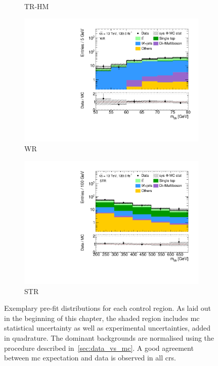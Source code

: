 \begin{figure}
\begin{subfigure}[b]{0.5\linewidth}
		\caption{TR-HM\label{fig:prefit_TRHM}}
	\end{subfigure}\hfill
	\begin{subfigure}[b]{0.5\linewidth}
		\centering\includegraphics[width=1.0\textwidth]{1Lbb_WR_mbb}
		\caption{WR\label{fig:prefit_WR}}
	\end{subfigure}\hfill
	\begin{subfigure}[b]{0.5\linewidth}
		\centering\includegraphics[width=1.0\textwidth]{1Lbb_STR_mbb}
		\caption{STR\label{fig:prefit_STCR}}
	\end{subfigure}\hfill

	\caption{Exemplary pre-fit distributions for each control region. As laid out in the beginning of this chapter, the shaded region includes \gls{mc} statistical uncertainty as well as experimental uncertainties, added in quadrature. The dominant backgrounds are normalised using the procedure described in~\cref{sec:data_vs_mc}. A good agreement between \gls{mc} expectation and data is observed in all \glspl{cr}.}
	\label{fig:CR_distributions_prefit}
\end{figure}


